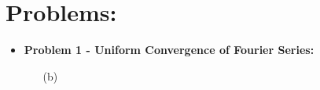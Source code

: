 \documentclass[12pt, reqno]{amsart}
\theoremstyle{definition}
\theoremstyle{remark}
\begin{document}


\section{Problems:} 

\begin{itemize}

\item {\bf{Problem 1 - Uniform Convergence of Fourier Series:}} %

\vspace{0.1 cm}
\begin{itemize}

\item[(b)] %


\end{itemize}
\end{itemize}
\end{document}
